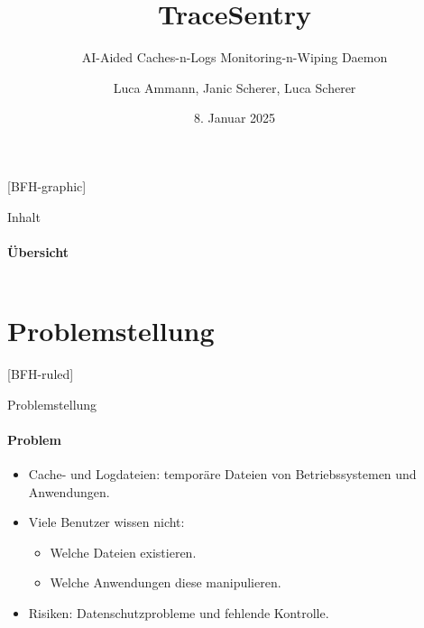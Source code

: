 \documentclass[
	ngerman,%
	authorontitle=true,
	]{bfhbeamer}
\title{TraceSentry}
\subtitle{AI-Aided Caches-n-Logs Monitoring-n-Wiping Daemon}
\author[L. Ammann, J. Scherer, L. Scherer]{Luca Ammann, Janic Scherer, Luca Scherer}
\date{8. Januar 2025}
\institute{BFH-TI}
\begin{document}
[BFH-graphic]
\maketitle

\begin{frame}{Inhalt}
	\framesubtitle{Übersicht}
	\begin{columns}
		\begin{column}{0.4\textwidth}
			\tableofcontents
		\end{column}
		\begin{column}{0.6\textwidth}
			\begin{center}
			\end{center}
		\end{column}
	\end{columns}
\end{frame}


\section{Problemstellung}\label{sec:problemstellung}
[BFH-ruled]
\frame{\sectionpage}

\begin{frame}{Problemstellung}
	\framesubtitle{Problem}
	\begin{itemize}
		\item Cache- und Logdateien: tempor\"are Dateien von Betriebssystemen und Anwendungen.
		\item Viele Benutzer wissen nicht:
		\begin{itemize}
			\item Welche Dateien existieren.
			\item Welche Anwendungen diese manipulieren.
		\end{itemize}
		\item Risiken: Datenschutzprobleme und fehlende Kontrolle.
	\end{itemize}
\end{frame}
\end{document}
